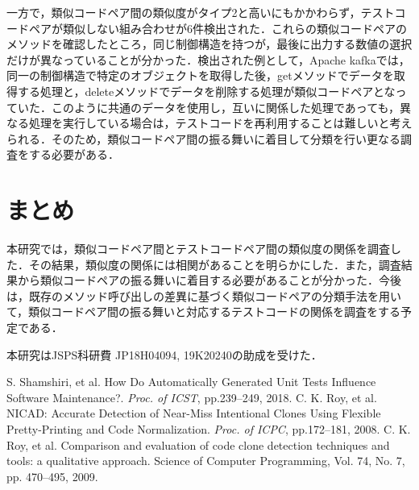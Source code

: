 \documentclass{fose2019}           %
\begin{document}
\indent 一方で，類似コードペア間の類似度がタイプ2と高いにもかかわらず，テストコードペアが類似しない組み合わせが6件検出された．これらの類似コードペアのメソッドを確認したところ，同じ制御構造を持つが，最後に出力する数値の選択だけが異なっていることが分かった．検出された例として，Apache kafkaでは，同一の制御構造で特定のオブジェクトを取得した後，getメソッドでデータを取得する処理と，deleteメソッドでデータを削除する処理が類似コードペアとなっていた．このように共通のデータを使用し，互いに関係した処理であっても，異なる処理を実行している場合は，テストコードを再利用することは難しいと考えられる．そのため，類似コードペア間の振る舞いに着目して分類を行い更なる調査をする必要がある．

\section{まとめ}
本研究では，類似コードペア間とテストコードペア間の類似度の関係を調査した．その結果，類似度の関係には相関があることを明らかにした．また，調査結果から類似コードペアの振る舞いに着目する必要があることが分かった．今後は，既存のメソッド呼び出しの差異に基づく類似コードペアの分類手法を用いて，類似コードペア間の振る舞いと対応するテストコードの関係を調査をする予定である．
%

\acknowledgements{}
本研究はJSPS科研費 JP18H04094, 19K20240の助成を受けた．


\begin{thebibliography}{2}
 S. Shamshiri, et al. How Do Automatically Generated Unit Tests Influence Software Maintenance?. {\it Proc. of ICST}, pp.239--249, 2018. 
 C. K. Roy, et al. NICAD: Accurate Detection of Near-Miss Intentional Clones Using Flexible Pretty-Printing and Code Normalization. {\it Proc. of ICPC}, pp.172--181, 2008.
 C. K. Roy, et al. Comparison and evaluation of code clone detection techniques and tools: a qualitative approach. Science of Computer Programming, Vol. 74, No. 7, pp. 470–495, 2009.
\end{thebibliography}
\end{document}
